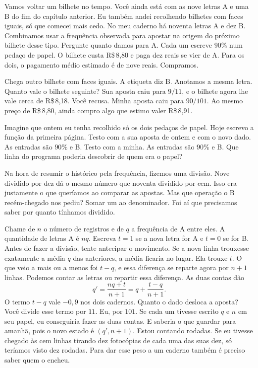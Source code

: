 Vamos voltar um bilhete no tempo. Você ainda está com as nove letras A e uma B do fim do capítulo anterior. Eu também andei recolhendo bilhetes com faces iguais, só que comecei mais cedo. No meu caderno há noventa letras A e dez B. Combinamos usar a frequência observada para apostar na origem do próximo bilhete desse tipo. Pergunte quanto damos para A. Cada um escreve $90\%$ num pedaço de papel. O bilhete custa R\$\,8,80 e paga dez reais se vier de A. Para os dois, o pagamento médio estimado é de nove reais. Compramos.

Chega outro bilhete com faces iguais. A etiqueta diz B. Anotamos a mesma letra. Quanto vale o bilhete seguinte? Sua aposta caiu para $9/11$, e o bilhete agora lhe vale cerca de R\$\,8,18. Você recusa. Minha aposta caiu para $90/101$. Ao mesmo preço de R\$\,8,80, ainda compro algo que estimo valer R\$\,8,91.

Imagine que ontem eu tenha recolhido só os dois pedaços de papel. Hoje escrevo a função da primeira página. Testo com a sua aposta de ontem e com o novo dado. As entradas são $90\%$ e B. Testo com a minha. As entradas são $90\%$ e B. Que linha do programa poderia descobrir de quem era o papel?

Na hora de resumir o histórico pela frequência, fizemos uma divisão. Nove dividido por dez dá o mesmo número que noventa dividido por cem. Isso era justamente o que queríamos ao comparar as apostas. Mas que operação o B recém-chegado nos pediu? Somar um ao denominador. Foi aí que precisamos saber por quanto tínhamos dividido.

Chame de $n$ o número de registros e de $q$ a frequência de A entre eles. A quantidade de letras A é $nq$. Escreva $t=1$ se a nova letra for A e $t=0$ se for B. Antes de fazer a divisão, tente antecipar o movimento. Se a nova linha trouxesse exatamente a média $q$ das anteriores, a média ficaria no lugar. Ela trouxe $t$. O que veio a mais ou a menos foi $t-q$, e essa diferença se reparte agora por $n+1$ linhas. Podemos contar as letras ou repartir essa diferença. As duas contas dão
\[
 q'=\frac{nq+t}{n+1}
    =q+\frac{t-q}{n+1}.
\]
O termo $t-q$ vale $-0{,}9$ nos dois cadernos. Quanto o dado desloca a aposta? Você divide esse termo por $11$. Eu, por $101$. Se cada um tivesse escrito $q$ e $n$ em seu papel, eu conseguiria fazer as duas contas. E saberia o que guardar para amanhã, pois o novo estado é $(q',n+1)$. Estou contando rodadas. Se eu tivesse chegado às cem linhas tirando dez fotocópias de cada uma das suas dez, só teríamos visto dez rodadas. Para dar esse peso a um caderno também é preciso saber quem o encheu.

